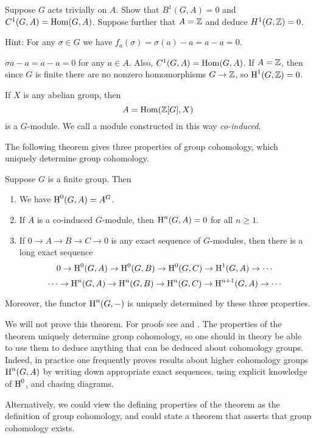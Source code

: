 \begin{exercise}
	Suppose $G$ acts trivially on $A$. Show that $B^1(G,A)=0$
	and $C^1(G,A) = \operatorname{Hom}(G,A)$.
	Suppose further that $A = \mathbb{Z}$ and deduce $H^1(G,\mathbb{Z}) = 0$.
	
	Hint: For any $\sigma\in G$ we have
	$f_a(\sigma) = \sigma(a) - a = a - a = 0$.
		
	$\sigma a - a = a -a =0$ for any $a\in A$.  Also, $C^1(G,A) =
	\operatorname{Hom}(G,A)$.  If $A=\mathbb{Z}$, then since $G$ is finite there are no nonzero
	homomorphisms $G\to \mathbb{Z}$, so $\operatorname{H}^1(G,\mathbb{Z})=0$.
\end{exercise}

If $X$ is any abelian group, then
$$
	A = \operatorname{Hom}(\mathbb{Z}[G], X)
$$
is a $G$-module.  We call a module constructed in this way
\emph{co-induced}.

The following theorem gives three properties of group cohomology,
which uniquely determine group cohomology.
\begin{theorem}
Suppose $G$ is a finite group.  Then
\begin{enumerate}
\item We have $\operatorname{H}^0(G,A) = A^G$.
\item If $A$ is a co-induced $G$-module, then $\operatorname{H}^n(G,A) = 0$ for all $n\geq 1$.
\item If $0\to A \to B \to C \to 0$ is any exact sequence of
$G$-modules, then there is a long exact sequence
$$
 0 \to \operatorname{H}^0(G,A) \to \operatorname{H}^0(G,B) \to \operatorname{H}^0(G,C) \to \operatorname{H}^1(G,A) \to \cdots
$$
$$
   \cdots \to \operatorname{H}^{n}(G,A) \to \operatorname{H}^{n}(G,B) \to \operatorname{H}^{n}(G,C) \to \operatorname{H}^{n+1}(G,A) \to \cdots
$$
\end{enumerate}
Moreover, the functor $\operatorname{H}^n(G,-)$ is uniquely determined by
these three properties.
\end{theorem}
We will not prove this theorem.  For proofs see
\cite[Atiyah-Wall]{cassels-frohlich} and
\cite[Ch.~7]{serre:localfields}. The properties of the theorem
uniquely determine group cohomology, so one should in theory be able
to use them to deduce anything that can be deduced about cohomology
groups.  Indeed, in practice one frequently proves results about
higher cohomology groups $\operatorname{H}^n(G,A)$ by writing down appropriate exact
sequences, using explicit knowledge of $\operatorname{H}^0$, and chasing diagrams.

\begin{remark}
  Alternatively, we could view the defining properties of the theorem
  as the definition of group cohomology, and could state a theorem
  that asserts that group cohomology exists.
\end{remark}

